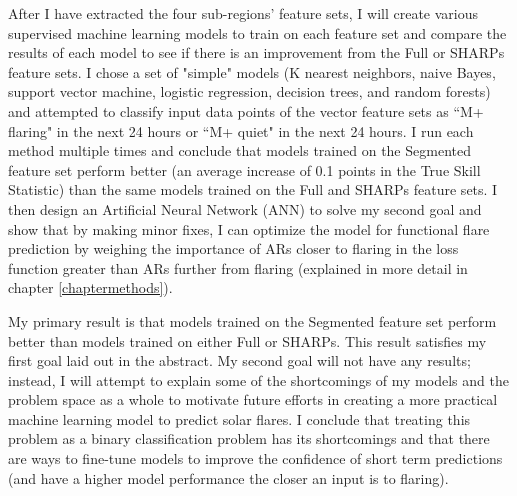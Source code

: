 After I have extracted the four sub-regions' feature sets, I will create various supervised machine learning models to train on each feature set and compare the results of each model to see if there is an improvement from the Full or SHARPs feature sets. I chose a set of "simple" models (K nearest neighbors, naive Bayes, support vector machine, logistic regression, decision trees, and random forests) and attempted to classify input data points of the vector feature sets as ``M+ flaring" in the next 24 hours or ``M+ quiet" in the next 24 hours. I run each method multiple times and conclude that models trained on the Segmented feature set perform better (an average increase of 0.1 points in the True Skill Statistic) than the same models trained on the Full and SHARPs feature sets. I then design an Artificial Neural Network (ANN) to solve my second goal and show that by making minor fixes, I can optimize the model for functional flare prediction by weighing the importance of ARs closer to flaring in the loss function greater than ARs further from flaring (explained in more detail in chapter \ref{chaptermethods}).

My primary result is that models trained on the Segmented feature set perform better than models trained on either Full or SHARPs. This result satisfies my first goal laid out in the abstract. My second goal will not have any results; instead, I will attempt to explain some of the shortcomings of my models and the problem space as a whole to motivate future efforts in creating a more practical machine learning model to predict solar flares. I conclude that treating this problem as a binary classification problem has its shortcomings and that there are ways to fine-tune models to improve the confidence of short term predictions (and have a higher model performance the closer an input is to flaring).